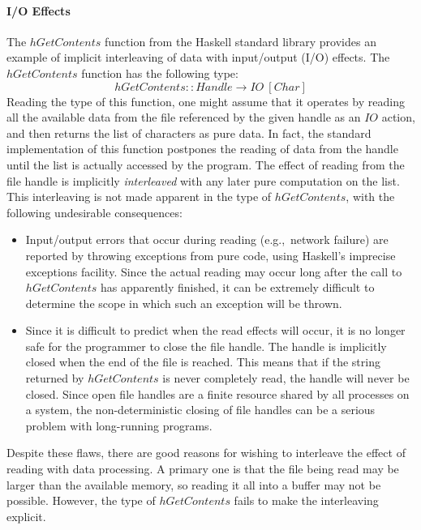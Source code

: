 \documentclass{jfp1}
\begin{document}
\paragraph{I/O Effects}

The $\mathit{hGetContents}$ function from the Haskell standard library
provides an example of implicit interleaving of data with input/output
(I/O) effects. The $\mathit{hGetContents}$ function has the following
type:
\begin{displaymath}
  \mathit{hGetContents} :: \mathit{Handle} \to \mathit{IO}~[\mathit{Char}]
\end{displaymath}
Reading the type of this function, one might assume that it operates
by reading all the available data from the file referenced by the
given handle as an $\mathit{IO}$ action, and then returns the list of
characters as pure data. In fact, the standard implementation of this
function postpones the reading of data from the handle until the list
is actually accessed by the program. The effect of reading from the
file handle is implicitly \emph{interleaved} with any later pure
computation on the list. This interleaving is not made apparent in the
type of $\mathit{hGetContents}$, with the following undesirable
consequences:
\begin{itemize}
\item Input/output errors that occur during reading (e.g.,~network
  failure) are reported by throwing exceptions from pure code, using
  Haskell's imprecise exceptions facility. Since the actual reading
  may occur long after the call to $\mathit{hGetContents}$ has
  apparently finished, it can be extremely difficult to determine the
  scope in which such an exception will be thrown.
\item Since it is difficult to predict when the read effects will
  occur, it is no longer safe for the programmer to close the file
  handle. The handle is implicitly closed when the end of the file is
  reached. This means that if the string returned by
  $\mathit{hGetContents}$ is never completely read, the handle will
  never be closed. Since open file handles are a finite resource
  shared by all processes on a system, the non-deterministic closing
  of file handles can be a serious problem with long-running programs.
\end{itemize}
Despite these flaws, there are good reasons for wishing to interleave
the effect of reading with data processing. A primary one is that the
file being read may be larger than the available memory, so reading it
all into a buffer may not be possible. However, the type of
$\mathit{hGetContents}$ fails to make the interleaving explicit.
\end{document}
